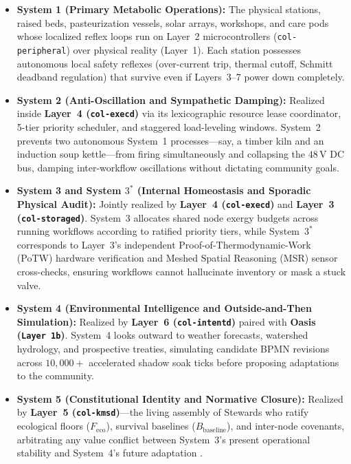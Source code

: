 \begin{itemize}
\item \textbf{System 1 (Primary Metabolic Operations):} The physical stations, raised beds,
        pasteurization vessels, solar arrays, workshops, and care pods whose localized
        reflex loops run on Layer~2 microcontrollers (\texttt{col-peripheral}) over physical
        reality (Layer~1). Each station possesses autonomous local safety reflexes
        (over-current trip, thermal cutoff, Schmitt deadband regulation) that survive even
        if Layers~3--7 power down completely.
\item \textbf{System 2 (Anti-Oscillation and Sympathetic Damping):} Realized inside
        \textbf{Layer~4 (\texttt{col-execd})} via its lexicographic resource lease
        coordinator, 5-tier priority scheduler, and staggered load-leveling windows.
        System~2 prevents two autonomous System~1 processes---say, a timber kiln and an
        induction soup kettle---from firing simultaneously and collapsing the
        $48\,\mathrm{V}$ DC bus, damping inter-workflow oscillations without dictating
        community goals.
\item \textbf{System 3 and System $3^*$ (Internal Homeostasis and Sporadic Physical Audit):}
        Jointly realized by \textbf{Layer~4 (\texttt{col-execd})} and \textbf{Layer~3
        (\texttt{col-storaged})}. System~3 allocates shared node exergy budgets across
        running workflows according to ratified priority tiers, while System~$3^*$
        corresponds to Layer~3's independent Proof-of-Thermodynamic-Work (PoTW) hardware
        verification and Meshed Spatial Reasoning (MSR) sensor cross-checks, ensuring
        workflows cannot hallucinate inventory or mask a stuck valve.
\item \textbf{System 4 (Environmental Intelligence and Outside-and-Then Simulation):}
        Realized by \textbf{Layer~6 (\texttt{col-intentd})} paired with \textbf{Oasis
        (\texttt{Layer 1b})}. System~4 looks outward to weather forecasts, watershed
        hydrology, and prospective treaties, simulating candidate BPMN revisions across
        $10{,}000+$ accelerated shadow soak ticks before proposing adaptations to the
        community.
\item \textbf{System 5 (Constitutional Identity and Normative Closure):} Realized by
        \textbf{Layer~5 (\texttt{col-kmsd})}---the living assembly of Stewards who ratify
        ecological floors ($F_{\mathrm{eco}}$), survival baselines
        ($B_{\mathrm{baseline}}$), and inter-node covenants, arbitrating any value conflict
        between System~3's present operational stability and System~4's future adaptation
        \parencite{ostrom1990}.
\end{itemize}

